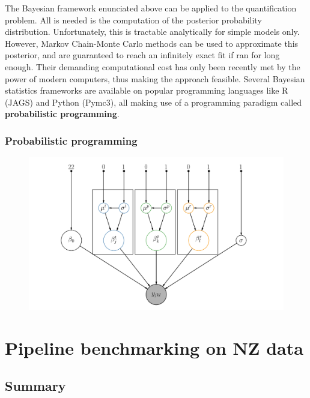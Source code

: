 \documentclass[11pt, a4paper]{report}
\begin{document}
The Bayesian framework enunciated above can be applied to the quantification problem. All is needed is the computation of the posterior probability distribution. Unfortunately, this is tractable analytically for simple models only. However, Markov Chain-Monte Carlo methods can be used to approximate this posterior, and are guaranteed to reach an infinitely exact fit if ran for long enough. Their demanding computational cost has only been recently met by the power of modern computers, thus making the approach feasible. Several Bayesian statistics frameworks are available on popular programming languages like R (JAGS) and Python (Pymc3), all making use of a programming paradigm called \textbf{probabilistic programming}.


\subsection{Probabilistic programming}


\begin{figure}[!h]
\centering
\includegraphics[width=\textwidth]{graph}
\end{figure}




\chapter{Pipeline benchmarking on \ac{NZ} data}
\label{chap:benchmark}

\section*{Summary}
\end{document}
